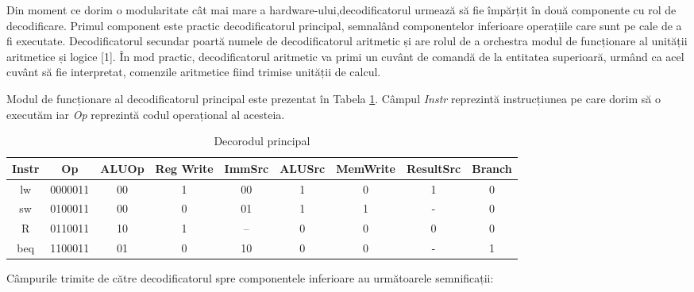 \documentclass[12pt]{article}
\begin{document}
Din moment ce dorim o modularitate cât mai mare a hardware-ului,decodificatorul urmează să fie împărțit în două componente cu rol de decodificare. Primul component este practic decodificatorul principal, semnalând componentelor inferioare operațiile care sunt pe cale de a fi executate. Decodificatorul secundar poartă numele de decodificatorul aritmetic și are rolul de a orchestra modul de funcționare al unității aritmetice și logice [1]. În mod practic, decodificatorul aritmetic va primi un cuvânt de comandă de la entitatea superioară, urmând ca  acel cuvânt să fie interpretat, comenzile aritmetice fiind trimise unității de calcul.

Modul de funcționare al decodificatorul principal este prezentat în Tabela \ref{Tabela:16}. Câmpul \textit{Instr} reprezintă instrucțiunea pe care dorim să o executăm iar \textit{Op} reprezintă codul operațional al acesteia.

 \begin{table}[h]
\centering
\begin{tabular}{ ||c|c|c|c|c|c|c|c|c|| }
 \hline
 Instr & Op & ALUOp & Reg Write & ImmSrc & ALUSrc & MemWrite & ResultSrc & Branch \\ 
 \hline
 \hline
 lw & 0000011 & 00 & 1 & 00 & 1 & 0 & 1 & 0 \\
 \hline
 \hline
  sw & 0100011 & 00 & 0 & 01 & 1 & 1 & - & 0 \\
 \hline
 \hline
  R & 0110011 & 10 & 1 & -- & 0 & 0 & 0 & 0 \\
 \hline
 \hline
  beq & 1100011 & 01 & 0 & 10 & 0 & 0 & - & 1 \\
 \hline
\end{tabular}
\caption{Decorodul principal}
\label{Tabela:16}
\end{table}

Câmpurile trimite de către decodificatorul spre componentele inferioare au următoarele semnificații:
\end{document}
